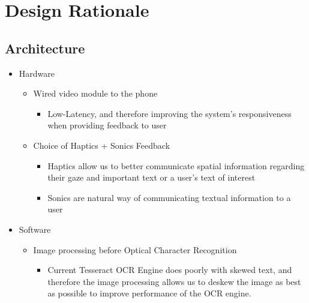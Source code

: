 \chapter{Design Rationale}

	\section{Architecture}
		\begin{itemize}
			\item Hardware
			\begin{itemize}
				\item Wired video module to the phone
				\begin{itemize}
					\item Low-Latency, and therefore improving the system's responsiveness when providing feedback to user
				\end{itemize}
				\item Choice of Haptics + Sonics Feedback
				\begin{itemize}
					\item Haptics allow us to better communicate spatial information regarding their gaze and important text or a user's text of interest
					\item Sonics are natural way of communicating textual information to a user
				\end{itemize}
			\end{itemize}


			\item Software
			\begin{itemize}
				\item Image processing before Optical Character Recognition
				\begin{itemize}
					\item Current Tesseract OCR Engine does poorly with skewed text, and therefore the image processing allows us to deskew the image as best as possible to improve performance of the OCR engine.
				\end{itemize}
			\end{itemize}
		\end{itemize}
\pagebreak
